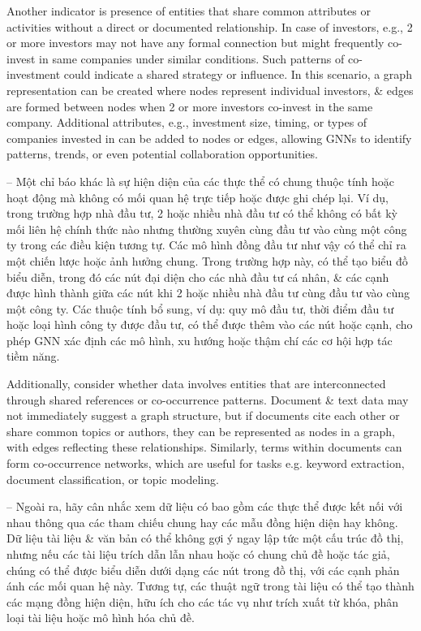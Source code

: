 \documentclass{article}
\begin{document}
\begin{itemize}
\begin{itemize}
\begin{itemize}
            Another indicator is presence of entities that share common attributes or activities without a direct or documented relationship. In case of investors, e.g., 2 or more investors may not have any formal connection but might frequently co-invest in same companies under similar conditions. Such patterns of co-investment could indicate a shared strategy or influence. In this scenario, a graph representation can be created where nodes represent individual investors, \& edges are formed between nodes when 2 or more investors co-invest in the same company. Additional attributes, e.g., investment size, timing, or types of companies invested in can be added to nodes or edges, allowing GNNs to identify patterns, trends, or even potential collaboration opportunities.

            -- Một chỉ báo khác là sự hiện diện của các thực thể có chung thuộc tính hoặc hoạt động mà không có mối quan hệ trực tiếp hoặc được ghi chép lại. Ví dụ, trong trường hợp nhà đầu tư, 2 hoặc nhiều nhà đầu tư có thể không có bất kỳ mối liên hệ chính thức nào nhưng thường xuyên cùng đầu tư vào cùng một công ty trong các điều kiện tương tự. Các mô hình đồng đầu tư như vậy có thể chỉ ra một chiến lược hoặc ảnh hưởng chung. Trong trường hợp này, có thể tạo biểu đồ biểu diễn, trong đó các nút đại diện cho các nhà đầu tư cá nhân, \& các cạnh được hình thành giữa các nút khi 2 hoặc nhiều nhà đầu tư cùng đầu tư vào cùng một công ty. Các thuộc tính bổ sung, ví dụ: quy mô đầu tư, thời điểm đầu tư hoặc loại hình công ty được đầu tư, có thể được thêm vào các nút hoặc cạnh, cho phép GNN xác định các mô hình, xu hướng hoặc thậm chí các cơ hội hợp tác tiềm năng.

            Additionally, consider whether data involves entities that are interconnected through shared references or co-occurrence patterns. Document \& text data may not immediately suggest a graph structure, but if documents cite each other or share common topics or authors, they can be represented as nodes in a graph, with edges reflecting these relationships. Similarly, terms within documents can form co-occurrence networks, which are useful for tasks e.g. keyword extraction, document classification, or topic modeling.

            -- Ngoài ra, hãy cân nhắc xem dữ liệu có bao gồm các thực thể được kết nối với nhau thông qua các tham chiếu chung hay các mẫu đồng hiện diện hay không. Dữ liệu tài liệu \& văn bản có thể không gợi ý ngay lập tức một cấu trúc đồ thị, nhưng nếu các tài liệu trích dẫn lẫn nhau hoặc có chung chủ đề hoặc tác giả, chúng có thể được biểu diễn dưới dạng các nút trong đồ thị, với các cạnh phản ánh các mối quan hệ này. Tương tự, các thuật ngữ trong tài liệu có thể tạo thành các mạng đồng hiện diện, hữu ích cho các tác vụ như trích xuất từ khóa, phân loại tài liệu hoặc mô hình hóa chủ đề.


\end{itemize}
\end{itemize}
\end{itemize}
\end{document}
